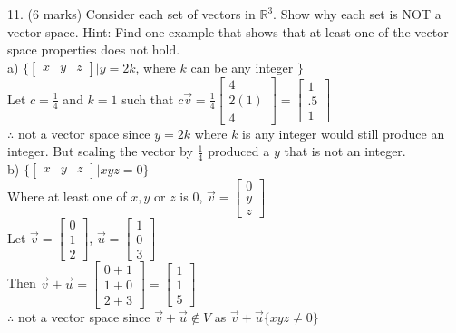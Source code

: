 \documentclass[a4paper]{article}
\begin{document}
11. (6 marks) Consider each set of vectors in $\mathbb{R}^3$. Show why each set is NOT a vector space. Hint: Find one example that shows that at least one of the vector space properties does not hold.\\
a) $\{\begin{bmatrix}
x&y&z
\end{bmatrix} | y = 2k$, where $k$ can be any integer $\}$\\
Let $c = \frac{1}{4}$ and $k = 1$ such that $c\vec{v} = \frac{1}{4}\begin{bmatrix}
4\\
2(1)\\
4
\end{bmatrix} = \begin{bmatrix}
1\\
.5\\
1
\end{bmatrix}$\\
$\therefore$ not a vector space since $y = 2k$ where $k$ is any integer would still produce an integer. But scaling the vector by $\frac{1}{4}$ produced a $y$ that is not an integer.\\
b) $\{\begin{bmatrix}
x&y&z
\end{bmatrix} | xyz = 0 \}$\\
Where at least one of $x,y$ or $z$ is $0$, $\vec{v} = \begin{bmatrix}
0\\
y\\
z
\end{bmatrix}$\\
Let $\vec{v} = \begin{bmatrix}
0\\
1\\
2
\end{bmatrix}$, $\vec{u} = \begin{bmatrix}
1\\
0\\
3
\end{bmatrix}$\\
Then $\vec{v} + \vec{u} = \begin{bmatrix}
0+1\\
1+0\\
2+3
\end{bmatrix} = \begin{bmatrix}
1\\
1\\
5
\end{bmatrix}$\\
$\therefore$ not a vector space since $\vec{v} + \vec{u} \notin V$ as $\vec{v} + \vec{u} \{xyz \neq 0 \}$\\
\end{document}

